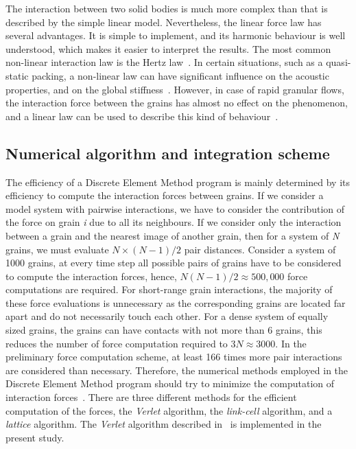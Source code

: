 The interaction between two solid bodies is much more complex than that is 
described by the simple linear model. Nevertheless, the linear force law has 
several advantages. It is simple to implement, and its harmonic behaviour is 
well understood, which makes it easier to interpret the results. The 
most common non-linear interaction law is the Hertz law~\citep{Hertz1882}. In 
certain situations, such as a quasi-static packing, a non-linear law can have 
significant influence on the acoustic properties, and on the global 
stiffness~\citep{Agnolin2007}. However, in case of rapid granular flows, 
the interaction force between the grains has almost no effect on the 
phenomenon, and a linear law can be used to describe this kind of 
behaviour~\citep{Radjai2011}. 


\subsection{Numerical algorithm and integration scheme}
The efficiency of a Discrete Element Method program is mainly determined by 
its efficiency to compute the interaction forces between grains. If we 
consider a model system with pairwise interactions, we have to consider the 
contribution of the force on grain \textit{i} due to all its neighbours. If we 
consider only the interaction between a grain and the nearest image of another 
grain, then for a system of \textit{N} grains, we must evaluate $N \times 
(N-1)/2$ pair distances. Consider a system of 1000 grains, at every time step 
all possible pairs of grains have to be considered to compute the interaction 
forces, hence, $\mathit{N}(\mathit{N}-1)/2 \approx 500,000$ force computations 
are required. For short-range grain interactions, the majority of these force 
evaluations is unnecessary as the corresponding grains are located far apart 
and do not necessarily touch each other. For a dense system of equally sized 
grains, the grains can have contacts with not more than 6 grains, this reduces 
the number of force computation required to $3\mathit{N} \approx 3000$. In the 
preliminary force computation scheme, at least 166 times more pair interactions 
are considered than necessary. Therefore, the numerical methods employed in the 
Discrete Element Method program should try to minimize the computation of 
interaction forces~\citep{Poschel2005}. There are three different methods for 
the efficient computation of the forces, the \textit{Verlet} algorithm, the 
\textit{link-cell} algorithm, and a \textit{lattice} algorithm. The 
\textit{Verlet} algorithm described in~\citet{Grubmuller1991} 
is implemented in the present study.

